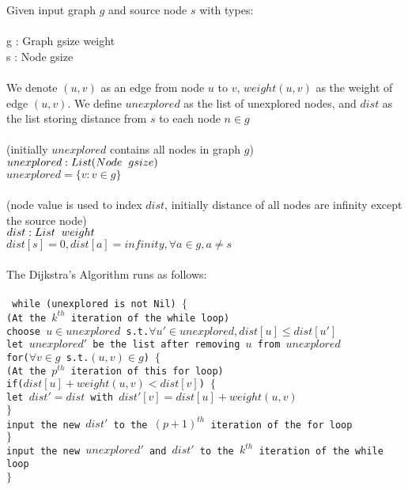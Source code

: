 \documentclass[11pt, a4paper]{article} %
\theoremstyle{definition}
\newcommand\tab[1][1cm]{\hspace*{#1}}
\newcommand\tsp[1][0.2cm]{\hspace*{#1}}
\begin{document}
Given input graph $g$ and source node $s$ with types:
\\\\
  \tab g : Graph gsize weight\\
  \tab s : Node gsize
\\\\
We denote $(u, v)$ as an edge from node $u$ to $v$, $weight(u, v)$ as the weight of edge $(u, v)$. We define $unexplored$ as the list of unexplored nodes, and $dist$ as the list storing distance from $s$ to each node $n \in g$
\\\\
\tab (initially $unexplored$ contains all nodes in graph $g$)\\
\tab $unexplored : List (Node \tsp gsize)$\\
\tab $unexplored = \{v : v \in g\}$
\\\\
\tab (node value is used to index $dist$, initially distance of all nodes are infinity except 
\\ \tab the source node)\\
\tab $dist : List \tsp weight$ \\
\tab $dist[s] = 0, dist[a] = infinity, \forall a \in g, a \neq s$
\\\\
The Dijkstra's Algorithm runs as follows: 
\\\\
\texttt{
  \tab while (unexplored is not Nil) 
  \tab$\{$ \\
  \tab\tab (At the $k^{th}$ iteration of the while loop)                                          \\
  \tab\tab choose $u \in unexplored$ s.t.$\forall u' \in unexplored, dist[u] \leq dist[u']$     \\
  \tab\tab let $unexplored'$ be the list after removing $u$ from $unexplored$                    \\
  \tab\tab for($\forall v \in g$ s.t.$(u, v) \in g$) $\{$                                 \\  
  \tab\tab\tab (At the $p^{th}$ iteration of this for loop)                                \\
  \tab\tab\tab  if($dist[u] + weight(u, v) < dist[v]$) $\{$                              \\
  \tab\tab\tab\tab  let $dist' = dist$ with $dist'[v] = dist[u] + weight(u, v)$          \\
  \tab\tab\tab $\}$ \\ 
  \tab\tab\tab input the new $dist'$ to the $(p+1)^{th}$ iteration of the for loop \\
  \tab\tab $\}$ \\
  \tab\tab input the new $unexplored'$ and $dist'$ to the $k^{th}$ iteration of the while loop \\
  \tab $\}$
}
\end{document}
